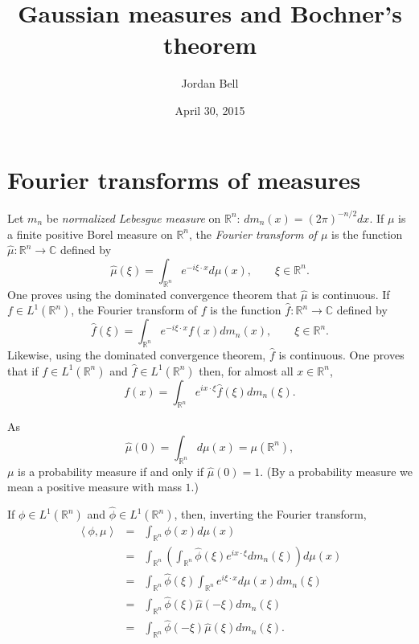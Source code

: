 \documentclass{article}
\newcommand{\inner}[2]{\left\langle #1, #2 \right\rangle}
\theoremstyle{definition}
\begin{document}
\title{Gaussian measures and Bochner's theorem}
\author{Jordan Bell}
\date{April 30, 2015}

\maketitle

\section{Fourier transforms of measures}
Let $m_n$ be {\em normalized Lebesgue measure} on $\mathbb{R}^n$: $dm_n(x) = (2\pi)^{-n/2} dx$. 
If $\mu$ is a finite  positive Borel  measure on $\mathbb{R}^n$, the {\em Fourier transform of $\mu$} is the function
$\hat{\mu}:\mathbb{R}^n \to \mathbb{C}$ defined by
\[
\hat{\mu}(\xi) = \int_{\mathbb{R}^n} e^{-i\xi \cdot x} d\mu(x), \qquad \xi \in \mathbb{R}^n.
\]
One proves using the dominated convergence theorem that $\hat{\mu}$ is continuous.
If $f \in L^1(\mathbb{R}^n)$, the Fourier transform of $f$ is the function $\hat{f}:\mathbb{R}^n \to \mathbb{C}$ defined by
\[
\hat{f}(\xi) = \int_{\mathbb{R}^n} e^{-i\xi\cdot x} f(x) dm_n(x), \qquad \xi \in \mathbb{R}^n.
\]
Likewise, using the dominated convergence theorem, $\hat{f}$ is continuous.
One proves that if $f \in L^1(\mathbb{R}^n)$ and $\hat{f} \in L^1(\mathbb{R}^n)$ then, for almost all $x \in \mathbb{R}^n$,
\[
f(x) = \int_{\mathbb{R}^n} e^{ix\cdot \xi} \hat{f}(\xi) dm_n(\xi).
\]

As
\[
\hat{\mu}(0)=\int_{\mathbb{R}^n} d\mu(x) = \mu(\mathbb{R}^n),
\]
$\mu$ is a probability measure if and only if $\hat{\mu}(0)=1$. (By a probability measure we mean a positive measure with mass $1$.)

If $\phi \in L^1(\mathbb{R}^n)$ and $\hat{\phi} \in L^1(\mathbb{R}^n)$, then, inverting the Fourier transform,
\begin{eqnarray*}
\inner{\phi}{\mu}&=&\int_{\mathbb{R}^n} \phi(x) d\mu(x)\\
&=&\int_{\mathbb{R}^n} \left(\int_{\mathbb{R}^n} \hat{\phi}(\xi) e^{ix\cdot \xi} dm_n(\xi) \right) d\mu(x)\\
&=& \int_{\mathbb{R}^n} \hat{\phi}(\xi) \int_{\mathbb{R}^n} e^{i\xi \cdot x} d\mu(x) dm_n(\xi)\\
&=&\int_{\mathbb{R}^n} \hat{\phi}(\xi) \hat{\mu}(-\xi) dm_n(\xi)\\
&=&\int_{\mathbb{R}^n} \hat{\phi}(-\xi) \hat{\mu}(\xi) dm_n(\xi).
\end{eqnarray*}
\end{document}
